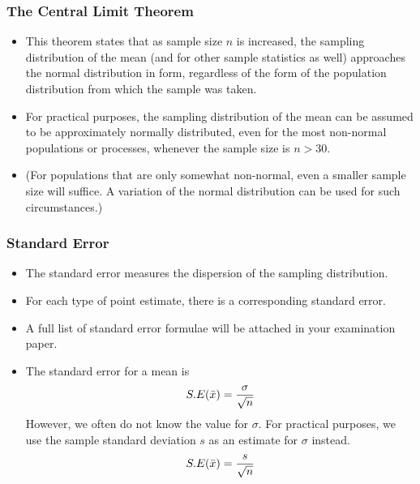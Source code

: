 \documentclass[a4]{beamer}
\begin{document}


\begin{frame}
\frametitle{The Central Limit Theorem }
\begin{itemize}
\item This theorem states that as sample size $n$ is increased, the sampling distribution of the mean (and for other sample statistics as well) approaches the normal distribution in form, regardless of the form of the population distribution from
which the sample was taken.

\item For practical purposes, the sampling distribution of the mean can be assumed to be
approximately normally distributed, even for the most non-normal populations or processes, whenever the
sample size is $n > 30$.

\item (For populations that are only somewhat non-normal, even a smaller sample size will
suffice. A variation of the normal distribution can be used for such circumstances.)
\end{itemize}


\end{frame}










\begin{frame}
\frametitle{Standard Error}

\begin{itemize}
\item The standard error measures the dispersion of the sampling distribution.
\item For each type of point estimate, there is a corresponding standard error.
\item A full list of standard error formulae will be attached in your examination paper.
\item The standard error for a  mean is
\[ S.E( \bar{x} )  = {\sigma \over \sqrt{n}} \]
However, we often do not know the value for $\sigma$. For practical purposes, we use the sample standard deviation $s$ as an estimate for $\sigma$ instead.
\[ S.E( \bar{x} )  = {s \over \sqrt{n}} \]
\end{itemize}

\end{frame}
\end{document}
